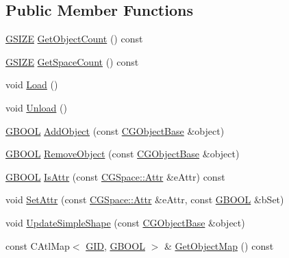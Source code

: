 \subsection*{Public Member Functions}
\begin{DoxyCompactItemize}
\item 
\hyperlink{_g_types_8h_ac7dd75e8df268a0368c6cb433764fdcb}{G\+S\+I\+Z\+E} \hyperlink{class_c_g_space_a8612563e37f05d76e0fbd610aa1c2ed2}{Get\+Object\+Count} () const 
\item 
\hyperlink{_g_types_8h_ac7dd75e8df268a0368c6cb433764fdcb}{G\+S\+I\+Z\+E} \hyperlink{class_c_g_space_aea4630aaf3ff7bd2e77c3f1e8c436c86}{Get\+Space\+Count} () const 
\item 
void \hyperlink{class_c_g_space_a79fb09fa13a27b224b9bc9b8bee3791a}{Load} ()
\item 
void \hyperlink{class_c_g_space_a37045f179832ac5821fdbc0f8021d9f0}{Unload} ()
\item 
\hyperlink{_g_types_8h_a2901915743626352a6820c5405f556dc}{G\+B\+O\+O\+L} \hyperlink{class_c_g_space_a0a1b1166857961a5f0d4a437f581a1e5}{Add\+Object} (const \hyperlink{class_c_g_object_base}{C\+G\+Object\+Base} \&object)
\item 
\hyperlink{_g_types_8h_a2901915743626352a6820c5405f556dc}{G\+B\+O\+O\+L} \hyperlink{class_c_g_space_ab945038e043b5c832f8f2394b1f00bbd}{Remove\+Object} (const \hyperlink{class_c_g_object_base}{C\+G\+Object\+Base} \&object)
\item 
\hyperlink{_g_types_8h_a2901915743626352a6820c5405f556dc}{G\+B\+O\+O\+L} \hyperlink{class_c_g_space_ad4c8e0b89b195f899e312406cf1e1ff9}{Is\+Attr} (const \hyperlink{class_c_g_space_ad9e165bcfd44f2d483e7f3e045d6a3c3}{C\+G\+Space\+::\+Attr} \&e\+Attr) const 
\item 
void \hyperlink{class_c_g_space_a8b05ec6f5ba6a1796eba303f5b7b382e}{Set\+Attr} (const \hyperlink{class_c_g_space_ad9e165bcfd44f2d483e7f3e045d6a3c3}{C\+G\+Space\+::\+Attr} \&e\+Attr, const \hyperlink{_g_types_8h_a2901915743626352a6820c5405f556dc}{G\+B\+O\+O\+L} \&b\+Set)
\item 
void \hyperlink{class_c_g_space_a4041d193b8f5f02ab925d35022d49395}{Update\+Simple\+Shape} (const \hyperlink{class_c_g_object_base}{C\+G\+Object\+Base} \&object)
\item 
const C\+Atl\+Map$<$ \hyperlink{_g_types_8h_a5b96ecb16d8e437977d12cd40aa6f6d8}{G\+I\+D}, \hyperlink{_g_types_8h_a2901915743626352a6820c5405f556dc}{G\+B\+O\+O\+L} $>$ \& \hyperlink{class_c_g_space_a4ed395194044d8e984eed839dbb60c3b}{Get\+Object\+Map} () const 

\end{DoxyCompactItemize}
